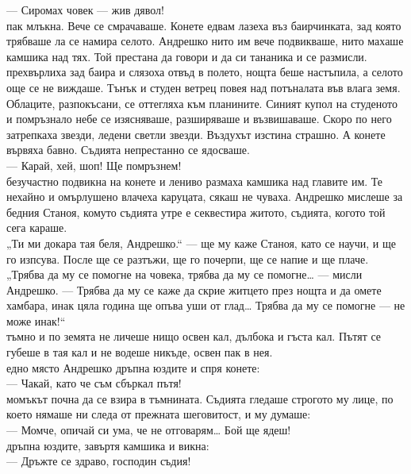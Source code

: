 \documentclass[12pt,a4paper]{article}
\begin{document}
— Сиромах човек — жив дявол!
\\
 пак млъкна. Вече се смрачаваше. Конете едвам лазеха въз баирчинката, зад която трябваше ла се намира селото. Андрешко нито им вече подвикваше, нито махаше камшика над тях. Той престана да говори и да си тананика и се размисли.
\\
 прехвърлиха зад баира и слязоха отвъд в полето, нощта беше настъпила, а селото още се не виждаше. Тънък и студен ветрец повея над потъналата във влага земя. Облаците, разпокъсани, се оттегляха към планините. Синият купол на студеното и помръзнало небе се изясняваше, разширяваше и възвишаваше. Скоро по него затрепкаха звезди, ледени светли звезди. Въздухът изстина страшно. А конете вървяха бавно. Съдията непрестанно се ядосваше.
\\
— Карай, хей, шоп! Ще помръзнем!
\\
 безучастно подвикна на конете и лениво размаха камшика над главите им. Те нехайно и омърлушено влачеха каруцата, сякаш не чуваха. Андрешко мислеше за бедния Станоя, комуто съдията утре е секвестира житото, съдията, когото той сега караше.
\\
\indent„Ти ми докара тая беля, Андрешко.“ — ще му каже Станоя, като се научи, и ще го изпсува. После ще се разтъжи, ще го почерпи, ще се напие и ще плаче.
\\
\indent„Трябва да му се помогне на човека, трябва да му се помогне… — мисли Андрешко. — Трябва да му се каже да скрие житцето през нощта и да омете хамбара, инак цяла година ще опъва уши от глад… Трябва да му се помогне — не може инак!“
\\
 тъмно и по земята не личеше нищо освен кал, дълбока и гъста кал. Пътят се губеше в тая кал и не водеше никъде, освен пак в нея.
\\
 едно място Андрешко дръпна юздите и спря конете:
\\
— Чакай, като че съм сбъркал пътя!
\\
 момъкът почна да се взира в тъмнината. Съдията гледаше строгото му лице, по което нямаше ни следа от прежната шеговитост, и му думаше:
\\
— Момче, опичай си ума, че не отговарям… Бой ще ядеш!
\\
 дръпна юздите, завъртя камшика и викна:
\\
— Дръжте се здраво, господин съдия!
\end{document}
